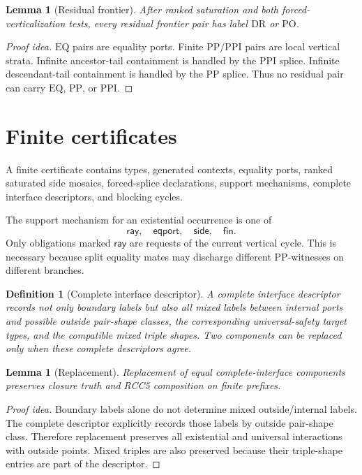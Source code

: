 \documentclass[11pt]{article}
\newtheorem{lemma}[theorem]{Lemma}
\newtheorem{definition}[theorem]{Definition}
\newcommand{\PP}{\mathrm{PP}}
\newcommand{\PPI}{\mathrm{PPI}}
\newcommand{\DR}{\mathrm{DR}}
\newcommand{\PO}{\mathrm{PO}}
\newcommand{\EQ}{\mathrm{EQ}}
\newcommand{\ray}{\mathsf{ray}}
\newcommand{\side}{\mathsf{side}}
\newcommand{\eport}{\mathsf{eqport}}
\newcommand{\fin}{\mathsf{fin}}
\begin{document}
\begin{lemma}[Residual frontier]
After ranked saturation and both forced-verticalization tests, every residual frontier pair has label $\DR$ or $\PO$.
\end{lemma}

\begin{proof}[Proof idea]
$\EQ$ pairs are equality ports.  Finite $\PP/\PPI$ pairs are local vertical strata.  Infinite ancestor-tail containment is handled by the $\PPI$ splice.  Infinite descendant-tail containment is handled by the $\PP$ splice.  Thus no residual pair can carry $\EQ$, $\PP$, or $\PPI$.
\end{proof}

\section{Finite certificates}

A finite certificate contains types, generated contexts, equality ports, ranked saturated side mosaics, forced-splice declarations, support mechanisms, complete interface descriptors, and blocking cycles.

The support mechanism for an existential occurrence is one of
\[
  \ray,\quad \eport,\quad \side,\quad \fin.
\]
Only obligations marked $\ray$ are requests of the current vertical cycle.  This is necessary because split equality mates may discharge different $\PP$-witnesses on different branches.

\begin{definition}[Complete interface descriptor]
A complete interface descriptor records not only boundary labels but also all mixed labels between internal ports and possible outside pair-shape classes, the corresponding universal-safety target types, and the compatible mixed triple shapes.  Two components can be replaced only when these complete descriptors agree.
\end{definition}

\begin{lemma}[Replacement]
Replacement of equal complete-interface components preserves closure truth and RCC5 composition on finite prefixes.
\end{lemma}

\begin{proof}[Proof idea]
Boundary labels alone do not determine mixed outside/internal labels.  The complete descriptor explicitly records those labels by outside pair-shape class.  Therefore replacement preserves all existential and universal interactions with outside points.  Mixed triples are also preserved because their triple-shape entries are part of the descriptor.
\end{proof}
\end{document}
